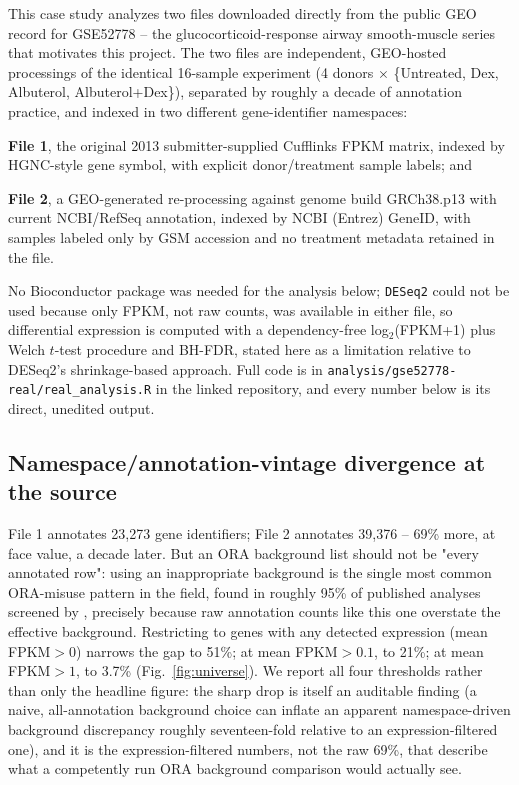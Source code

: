 \documentclass[webpdf,contemporary,large]{oup-authoring-template}
\theoremstyle{thmstyleone}%
\theoremstyle{thmstyletwo}%
\theoremstyle{thmstylethree}%
\begin{document}
This case study analyzes two files downloaded directly from the public GEO record for GSE52778 -- the glucocorticoid-response airway smooth-muscle series \citep{himes2014rnaseq} that motivates this project. The two files are independent, GEO-hosted processings of the identical 16-sample experiment (4 donors $\times$ \{Untreated, Dex, Albuterol, Albuterol+Dex\}), separated by roughly a decade of annotation practice, and indexed in two different gene-identifier namespaces:
\begin{unlist}
\item \textbf{File 1}, the original 2013 submitter-supplied Cufflinks FPKM matrix, indexed by HGNC-style gene symbol, with explicit donor/treatment sample labels; and
\item \textbf{File 2}, a GEO-generated re-processing against genome build GRCh38.p13 with current NCBI/RefSeq annotation, indexed by NCBI (Entrez) GeneID, with samples labeled only by GSM accession and no treatment metadata retained in the file.
\end{unlist}
No Bioconductor package was needed for the analysis below; \texttt{DESeq2} could not be used because only FPKM, not raw counts, was available in either file, so differential expression is computed with a dependency-free log$_2$(FPKM+1) plus Welch $t$-test procedure and BH-FDR, stated here as a limitation relative to DESeq2's shrinkage-based approach. Full code is in \texttt{analysis/gse52778-real/real\_analysis.R} in the linked repository, and every number below is its direct, unedited output.

\subsection{Namespace/annotation-vintage divergence at the source}\label{sec:real-universe}

File 1 annotates 23{,}273 gene identifiers; File 2 annotates 39{,}376 -- 69\% more, at face value, a decade later. But an ORA background list should not be "every annotated row": using an inappropriate background is the single most common ORA-misuse pattern in the field, found in roughly 95\% of published analyses screened by \citet{wijesooriya2022orabackground}, precisely because raw annotation counts like this one overstate the effective background. Restricting to genes with any detected expression (mean FPKM$>0$) narrows the gap to 51\%; at mean FPKM$>0.1$, to 21\%; at mean FPKM$>1$, to 3.7\% (Fig.~\ref{fig:universe}). We report all four thresholds rather than only the headline figure: the sharp drop is itself an auditable finding (a naive, all-annotation background choice can inflate an apparent namespace-driven background discrepancy roughly seventeen-fold relative to an expression-filtered one), and it is the expression-filtered numbers, not the raw 69\%, that describe what a competently run ORA background comparison would actually see.
\end{document}
